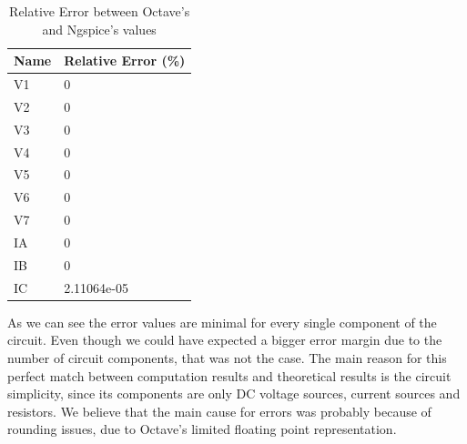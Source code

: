 \documentclass[11en, a4paper, oneside]{article}
\begin{document}
\begin{table}[h]
\begin{center}
\begin{tabular}{|l|l|}
\hline
\textbf{Name}    & \textbf{Relative Error (\%)} \\\hline
V1 & 0           \\\hline
V2 & 0 \\\hline
V3 & 0 \\\hline
V4 & 0 \\\hline
V5 & 0 \\\hline
V6 & 0 \\\hline
V7 & 0 \\\hline
IA & 0 \\\hline
IB & 0 \\\hline
IC & 2.11064e-05 \\\hline
\end{tabular}
\caption{Relative Error between Octave's and Ngspice's values}
\end{center}
\end{table}

As we can see the error values are minimal for every single component of the circuit. Even though we could have expected a bigger error margin due to the number of circuit components, that was not the case. The main reason for this perfect match between computation results and theoretical results is the circuit simplicity, since its components are only DC voltage sources, current sources and resistors. We believe that the main cause for errors was probably because of rounding issues, due to Octave's limited floating point representation.
\end{document}
